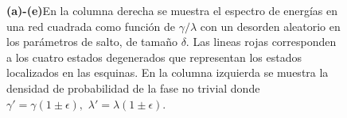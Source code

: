 \begin{figure}[thb!]
\begin{minipage}{0.8\textwidth}
\begin{minipage}[h!]{0.8\textwidth}
\begin{subfigure}[b!]{0.56 \textwidth}
                \end{subfigure}\hspace*{-0.5em}
            \end{minipage}\vspace*{-0.5em}
        \end{minipage} 
           \caption{\textbf{(a)-(e)}En la columna derecha se muestra el espectro de energías en una red cuadrada como función de $\gamma/\lambda $ con un desorden aleatorio en los parámetros de salto, de tamaño $\delta$. Las lineas rojas corresponden a los cuatro estados degenerados que representan los estados localizados en las esquinas. En la columna izquierda se muestra la densidad de probabilidad de la fase no trivial donde $\gamma' = \gamma( 1 \pm \epsilon) ,\, \, \lambda' = \lambda( 1 \pm \epsilon)$.  }
           \label{fig:Pram_Proy_Delta_cuadrado}
         
       \end{figure} 

    

